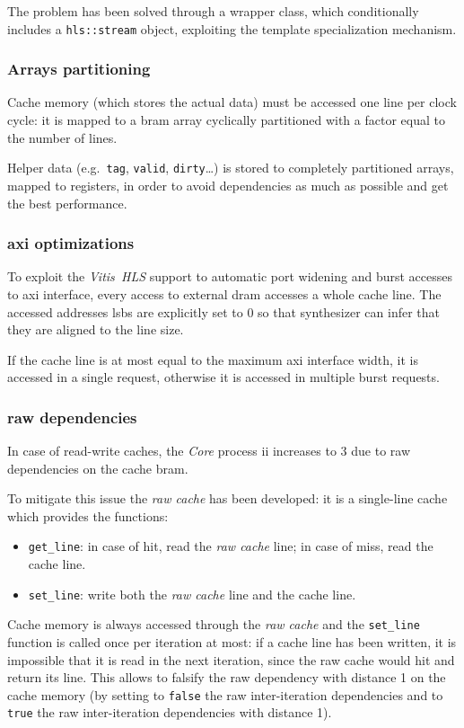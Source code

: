 \documentclass[11pt,a4paper,oneside]{memoir}
\begin{document}
\bigskip
The problem has been solved through a wrapper class, which conditionally
includes a \texttt{hls::stream} object, exploiting the template specialization
mechanism.

\subsubsection{Arrays partitioning}
Cache memory (which stores the actual data) must be accessed one line per clock
cycle: it is mapped to a \ac{bram} array cyclically partitioned with a factor
equal to the number of lines.

Helper data (e.g.\ \texttt{tag}, \texttt{valid}, \texttt{dirty}\ldots) is stored
to completely partitioned arrays, mapped to registers, in order to avoid
dependencies as much as possible and get the best performance.

\subsubsection{\ac{axi} optimizations}
To exploit the \emph{Vitis\texttrademark~HLS} support to automatic port
widening and burst accesses to \ac{axi} interface, every access to external
\ac{dram} accesses a whole cache line.
The accessed addresses \acp{lsb} are explicitly set to 0 so that synthesizer
can infer that they are aligned to the line size.

If the cache line is at most equal to the maximum \ac{axi} interface width, it
is accessed in a single request, otherwise it is accessed in multiple burst
requests.

\subsubsection{\acl{raw} dependencies}
In case of read-write caches, the \emph{Core} process \ac{ii} increases to 3
due to \ac{raw} dependencies on the cache \ac{bram}.

To mitigate this issue the \emph{\ac{raw} cache} has been developed: it is a
single-line cache which provides the functions:
\begin{itemize}
	\item \texttt{get\_line}: in case of hit, read the \emph{\ac{raw}
		cache} line; in case of miss, read the cache line.
	\item \texttt{set\_line}: write both the \emph{\ac{raw} cache} line and
		the cache line.
\end{itemize}

Cache memory is always accessed through the \emph{\ac{raw} cache} and the
\texttt{set\_line} function is called once per iteration at most: if a cache
line has been written, it is impossible that it is read in the next iteration,
since the \ac{raw} cache would hit and return its line. This allows to falsify
the \ac{raw} dependency with distance 1 on the cache memory (by setting to
\texttt{false} the \ac{raw} inter-iteration dependencies and to \texttt{true}
the \ac{raw} inter-iteration dependencies with distance 1).
\end{document}
